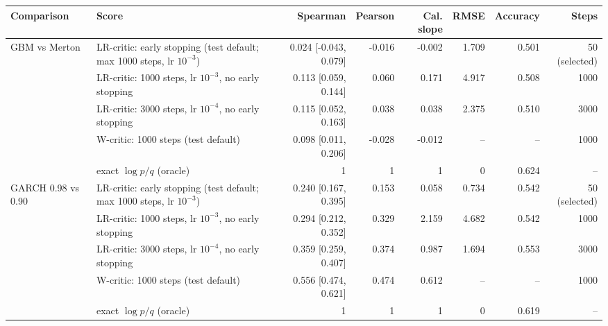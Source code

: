 \begin{tabular}{llrrrrrr}
\toprule
Comparison & Score & Spearman & Pearson & Cal. slope & RMSE & Accuracy & Steps \\
\midrule
GBM vs Merton & LR-critic: early stopping (test default; max 1000 steps, lr $10^{-3}$) & 0.024 [-0.043, 0.079] & -0.016 & -0.002 & 1.709 & 0.501 & 50 (selected) \\
 & LR-critic: 1000 steps, lr $10^{-3}$, no early stopping & 0.113 [0.059, 0.144] & 0.060 & 0.171 & 4.917 & 0.508 & 1000 \\
 & LR-critic: 3000 steps, lr $10^{-4}$, no early stopping & 0.115 [0.052, 0.163] & 0.038 & 0.038 & 2.375 & 0.510 & 3000 \\
 & W-critic: 1000 steps (test default) & 0.098 [0.011, 0.206] & -0.028 & -0.012 & -- & -- & 1000 \\
 & exact $\log p/q$ (oracle) & 1 & 1 & 1 & 0 & 0.624 & -- \\
GARCH 0.98 vs 0.90 & LR-critic: early stopping (test default; max 1000 steps, lr $10^{-3}$) & 0.240 [0.167, 0.395] & 0.153 & 0.058 & 0.734 & 0.542 & 50 (selected) \\
 & LR-critic: 1000 steps, lr $10^{-3}$, no early stopping & 0.294 [0.212, 0.352] & 0.329 & 2.159 & 4.682 & 0.542 & 1000 \\
 & LR-critic: 3000 steps, lr $10^{-4}$, no early stopping & 0.359 [0.259, 0.407] & 0.374 & 0.987 & 1.694 & 0.553 & 3000 \\
 & W-critic: 1000 steps (test default) & 0.556 [0.474, 0.621] & 0.474 & 0.612 & -- & -- & 1000 \\
 & exact $\log p/q$ (oracle) & 1 & 1 & 1 & 0 & 0.619 & -- \\
\bottomrule
\end{tabular}
